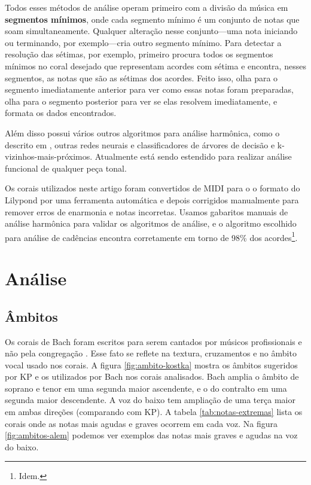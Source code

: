 Todos esses métodos de análise operam primeiro com a divisão da música
em \textbf{segmentos mínimos}, onde cada segmento mínimo é um conjunto
de notas que soam simultaneamente. Qualquer alteração nesse
conjunto---uma nota iniciando ou terminando, por exemplo---cria outro
segmento mínimo. Para detectar a resolução das sétimas, por exemplo,
\rameau{} primeiro procura todos os segmentos mínimos no coral
desejado que representam acordes com sétima e encontra, nesses
segmentos, as notas que são as sétimas dos acordes. Feito isso,
\rameau{} olha para o segmento imediatamente anterior para ver como
essas notas foram preparadas, olha para o segmento posterior para ver
se elas resolvem imediatamente, e formata os dados encontrados.

Além disso \rameau{} possui vários outros algoritmos para análise
harmônica, como o descrito em \cite{pardo.ea00:automated}, outras
redes neurais e classificadores de árvores de decisão e
k-vizinhos-mais-próximos. Atualmente \rameau{} está sendo estendido
para realizar análise funcional de qualquer peça tonal.

Os corais utilizados neste artigo foram convertidos de MIDI para o o
formato do Lilypond por uma ferramenta automática e depois corrigidos
manualmente para remover erros de enarmonia e notas incorretas. Usamos
gabaritos manuais de análise harmônica para validar os algoritmos de
análise, e o algoritmo escolhido para análise de cadências encontra
corretamente em torno de 98\% dos acordes\footnote{Idem.}.

\section{Análise}
\label{sec:analise}

\subsection{Âmbitos}
\label{sec:ambitos}

Os corais de Bach foram escritos para serem cantados por músicos
profissionais e não pela congregação \cite{bach41:371} . Esse fato
se reflete na textura, cruzamentos e no âmbito vocal usado nos corais.
A figura \ref{fig:ambito-kostka} mostra os âmbitos sugeridos por KP e
os utilizados por Bach nos corais analisados. Bach amplia o âmbito de
soprano e tenor em uma segunda maior ascendente, e o do contralto em
uma segunda maior descendente. A voz do baixo tem ampliação de uma
terça maior em ambas direções (comparando com KP). A tabela
\ref{tab:notas-extremas} lista os corais onde as notas mais agudas e
graves ocorrem em cada voz. Na figura \ref{fig:ambitos-alem} podemos
ver exemplos das notas mais graves e agudas na voz do baixo.

